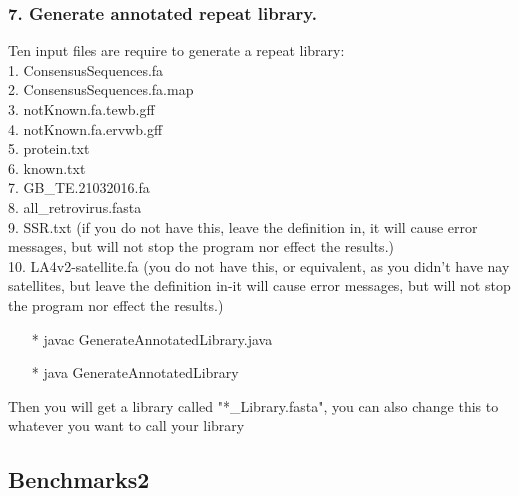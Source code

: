 \documentclass[12pt]{report}
\begin{document}
\subsubsection{7. Generate annotated repeat library.}
Ten input files are require to generate a repeat library: \\
1. ConsensusSequences.fa \\
2. ConsensusSequences.fa.map \\
3. notKnown.fa.tewb.gff \\
4. notKnown.fa.ervwb.gff \\
5. protein.txt \\
6. known.txt \\
7. GB\_TE.21032016.fa \\
8. all\_retrovirus.fasta \\
9. SSR.txt (if you do not have this, leave the definition in, it will cause error messages, but will not stop the program nor effect the results.) \\
10. LA4v2-satellite.fa (you do not have this, or equivalent, as you didn't have nay satellites, but leave the definition in-it will cause error messages, but will not stop the program nor effect the results.)
\begin{enumerate}
	\item[*] javac GenerateAnnotatedLibrary.java
	\item[*] java GenerateAnnotatedLibrary
\end{enumerate}
Then you will get a library called "*\_Library.fasta", you can also change this to whatever you want to call your library

\subsection*{Benchmarks2}
\end{document}
